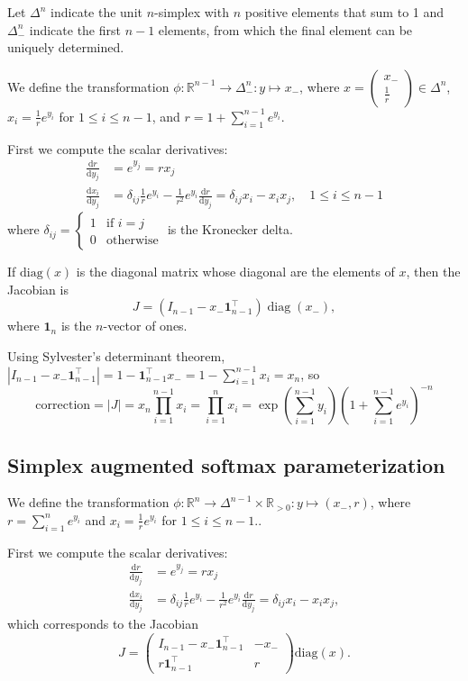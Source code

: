 \documentclass[11pt]{article}
\begin{document}
Let $\Delta^n$ indicate the unit $n$-simplex with $n$ positive
elements that sum to 1 and $\Delta^n_-$ indicate the first $n-1$
elements, from which the final element can be uniquely determined.

We define the transformation
$\phi: \mathbb{R}^{n-1} \to \Delta^n_-: y \mapsto x_-$, where
$x=\begin{pmatrix}x_- \\ \frac{1}{r}\end{pmatrix} \in \Delta^n$,
$x_i = \frac{1}{r} e^{y_i}$ for $1 \le i \le n-1$, and
$r = 1 + \sum_{i=1}^{n-1} e^{y_i}$.

First we compute the scalar derivatives:
\[
\begin{aligned}
  \frac{\mathrm{d} r}{\mathrm{d} y_j}
  &= e^{y_j} = r x_j\\
  \frac{\mathrm{d} x_i}{\mathrm{d} y_j}
  &= \delta_{ij} \frac{1}{r} e^{y_i} - \frac{1}{r^2} e^{y_i}
  \frac{\mathrm{d} r}{\mathrm{d} y_j}
  = \delta_{ij} x_i - x_i x_j, \quad 1 \le i \le n-1
\end{aligned}
\]
where
$\delta_{ij} = \begin{cases} 1 &\text{if } i = j \\ 0
  &\text{otherwise}\end{cases}$ is the Kronecker delta.

If $\mathrm{diag}(x)$ is the diagonal matrix whose diagonal are the
elements of $x$, then the Jacobian is
\[
  J = (I_{n-1} - x_- \boldsymbol{1}_{n-1}^\top) \operatorname{diag}(x_-),
\]
where $\boldsymbol{1}_n$ is the $n$-vector of ones.

Using Sylvester's determinant theorem,
$|I_{n-1} - x_- \boldsymbol{1}_{n-1}^\top| = 1 -
\boldsymbol{1}_{n-1}^\top x_- = 1 - \sum_{i=1}^{n-1} x_i = x_n$, so
$$\mathrm{correction} = |J| = x_n \prod_{i=1}^{n-1} x_i = \prod_{i=1}^{n} x_i = \exp\left(\sum_{i=1}^{n-1} y_i\right) \left(1 + \sum_{i=1}^{n-1} e^{y_i}\right)^{-n}$$


\subsection{Simplex augmented softmax parameterization}

We define the transformation
$\phi: \mathbb{R}^n \to \Delta^{n-1} \times \mathbb{R}_{>0}: y \mapsto
(x_-, r)$, where $r = \sum_{i=1}^n e^{y_i}$ and
$x_i = \frac{1}{r} e^{y_i}$ for $1 \le i \le n-1$..

First we compute the scalar derivatives:
\[
\begin{aligned}
  \frac{\mathrm{d} r}{\mathrm{d} y_j}
  &= e^{y_j} = r x_j
  \\
  \frac{\mathrm{d} x_i}{\mathrm{d} y_j}
  &= \delta_{ij} \frac{1}{r} e^{y_i} - \frac{1}{r^2} e^{y_i} \frac{\mathrm{d} r}{\mathrm{d} y_j} = \delta_{ij} x_i - x_i x_j,
\end{aligned}
\]
which corresponds to the Jacobian
\[
  J = \begin{pmatrix}I_{n-1} - x_- \boldsymbol{1}_{n-1}^\top & -x_- \\
    r \boldsymbol{1}_{n-1}^\top & r \end{pmatrix} \mathrm{diag}(x).
\]
\end{document}
